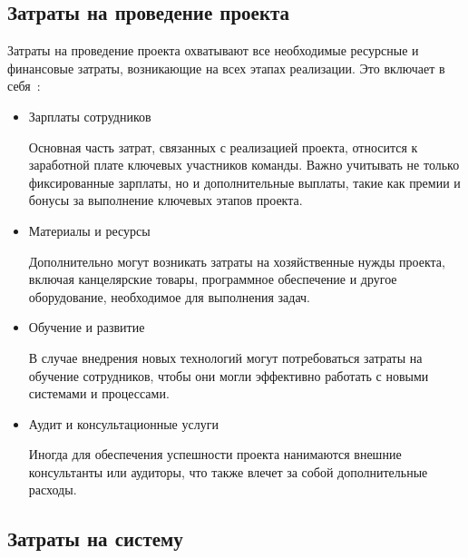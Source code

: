 \subsection{Затраты на проведение проекта}

Затраты на проведение проекта охватывают все необходимые ресурсные и финансовые затраты, возникающие на всех этапах реализации. Это включает в себя~\cite{project3}:
\begin{itemize}
	\item Зарплаты сотрудников 
	
	Основная часть затрат, связанных с реализацией проекта, относится к заработной плате ключевых участников команды. 
	Важно учитывать не только фиксированные зарплаты, но и дополнительные выплаты, такие как премии и бонусы за выполнение ключевых этапов проекта.
	\item Материалы и ресурсы
	
	Дополнительно могут возникать затраты на хозяйственные нужды проекта, включая канцелярские товары, программное обеспечение и другое оборудование, необходимое для выполнения задач.
	\item Обучение и развитие
	
	В случае внедрения новых технологий могут потребоваться затраты на обучение сотрудников, чтобы они могли эффективно работать с новыми системами и процессами.
	\item Аудит и консультационные услуги
	
	Иногда для обеспечения успешности проекта нанимаются внешние консультанты или аудиторы, что также влечет за собой дополнительные расходы.
\end{itemize}


\subsection{Затраты на систему}
	
